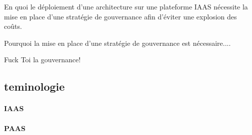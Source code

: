 

En quoi le déploiement d'une architecture sur une plateforme IAAS nécessite la mise en place d'une stratégie de gouvernance afin d'éviter une explosion des coûts.

Pourquoi la mise en place d'une stratégie de gouvernance est nécessaire....

Fuck Toi la gouvernance!





\subsection*{teminologie}
	\paragraph{IAAS}
	\paragraph{PAAS}